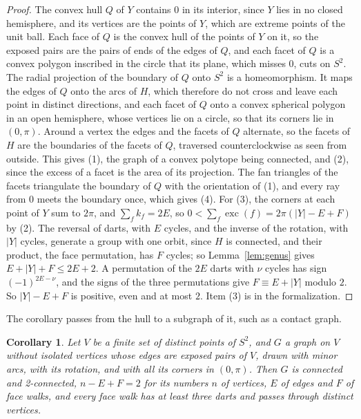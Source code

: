 \documentclass[12pt]{amsart}
\newtheorem{corollary}[theorem]{Corollary}
\theoremstyle{definition}
\theoremstyle{plain}
\theoremstyle{definition}
\newcommand{\Sph}{S^2}
\newcommand{\leanmap}[1]{\ignorespaces}
\newcommand{\mapnote}[1]{\ignorespaces}
\begin{document}
\begin{proof}
The convex hull $Q$ of $Y$ contains $0$ in its interior, since $Y$ lies in no closed hemisphere, and its vertices are the points of $Y$, which are extreme points of the unit ball. Each face of $Q$ is the convex hull of the points of $Y$ on it, so the exposed pairs are the pairs of ends of the edges of $Q$, and each facet of $Q$ is a convex polygon inscribed in the circle that its plane, which misses $0$, cuts on $\Sph$. The radial projection of the boundary of $Q$ onto $\Sph$ is a homeomorphism. It maps the edges of $Q$ onto the arcs of $H$, which therefore do not cross and leave each point in distinct directions, and each facet of $Q$ onto a convex spherical polygon in an open hemisphere, whose vertices lie on a circle, so that its corners lie in $(0,\pi)$. Around a vertex the edges and the facets of $Q$ alternate, so the facets of $H$ are the boundaries of the facets of $Q$, traversed counterclockwise as seen from outside. This gives (1), the graph of a convex polytope being connected, and (2), since the excess of a facet is the area of its projection. The fan triangles of the facets triangulate the boundary of $Q$ with the orientation of (1), and every ray from $0$ meets the boundary once, which gives (4). For (3), the corners at each point of $Y$ sum to $2\pi$, and $\sum_fk_f=2E$, so $0<\sum_f\operatorname{exc}(f)=2\pi(|Y|-E+F)$ by (2). The reversal of darts, with $E$ cycles, and the inverse of the rotation, with $|Y|$ cycles, generate a group with one orbit, since $H$ is connected, and their product, the face permutation, has $F$ cycles; so Lemma~\ref{lem:genus} gives $E+|Y|+F\le2E+2$. A permutation of the $2E$ darts with $\nu$ cycles has sign $(-1)^{2E-\nu}$, and the signs of the three permutations give $F\equiv E+|Y|$ modulo $2$. So $|Y|-E+F$ is positive, even and at most $2$. Item (3) is  in the formalization.
\end{proof}

The corollary passes from the hull to a subgraph of it, such as a contact graph.

\begin{corollary}\label{cor:twoconn}\leanmap{Tammes15.twoconn, Tammes15.twoconn_contact, Tammes15.not_closed_hemisphere, Tammes15.contact_exposed, Tammes15.region_excess, Tammes15.region_chi, Tammes15.euler_bound_regions, Tammes15.regions_count, Tammes15.spherical_of_regions, Tammes15.connected_of_regions, Tammes15.region_turn, Tammes15.region_wind, Tammes15.face_walk_injective, Tammes15.kconnected_two}\mapnote{for a finite set of distinct unit vectors and a graph on it without isolated vertices whose edges are exposed pairs, with the face walks of its rotation in place of the faces of the drawing; the second declaration is the case of a contact graph}
Let $V$ be a finite set of distinct points of $\Sph$, and $G$ a graph on $V$ without isolated vertices whose edges are exposed pairs of $V$, drawn with minor arcs, with its rotation, and with all its corners in $(0,\pi)$. Then $G$ is connected and 2-connected, $n-E+F=2$ for its numbers $n$ of vertices, $E$ of edges and $F$ of face walks, and every face walk has at least three darts and passes through distinct vertices.
\end{corollary}
\end{document}

